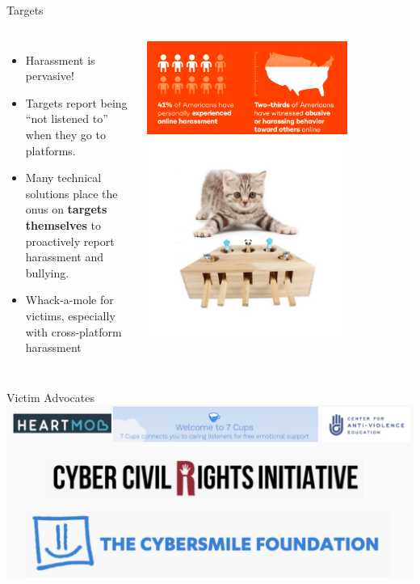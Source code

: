 \documentclass[nobackground,dvipsnames,table,aspectratio=169]{beamer}
\begin{document}
\begin{frame}{Targets}
    \begin{columns}
            \begin{itemize}
                \item Harassment is pervasive!
                \item Targets report being “not listened to” when they go to platforms.
                \item Many technical solutions place the onus on \textbf{targets themselves} to proactively report harassment and bullying.
                \item Whack-a-mole for victims, especially with cross-platform harassment 
            \end{itemize}
            \centering
            \includegraphics[width=0.75\textwidth]{harassment-stats}
            \includegraphics[width=0.75\textwidth]{whack-a-mole-kitten}
    \end{columns}
\end{frame}

\begin{frame}{Victim Advocates}
    \includegraphics[width=\textwidth]{victim-advocates}
\end{frame}
\end{document}
